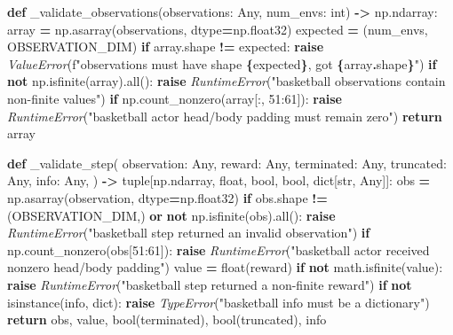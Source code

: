 \documentclass[
  american,
  11pt,
  letterpaper,
]{article}
\newenvironment{Shaded}{\begin{snugshade}}{\end{snugshade}}
\newcommand{\BuiltInTok}[1]{#1}
\newcommand{\ControlFlowTok}[1]{\textcolor[rgb]{0.13,0.29,0.53}{\textbf{#1}}}
\newcommand{\DecValTok}[1]{\textcolor[rgb]{0.00,0.00,0.81}{#1}}
\newcommand{\KeywordTok}[1]{\textcolor[rgb]{0.13,0.29,0.53}{\textbf{#1}}}
\newcommand{\NormalTok}[1]{#1}
\newcommand{\OperatorTok}[1]{\textcolor[rgb]{0.81,0.36,0.00}{\textbf{#1}}}
\newcommand{\PreprocessorTok}[1]{\textcolor[rgb]{0.56,0.35,0.01}{\textit{#1}}}
\newcommand{\SpecialCharTok}[1]{\textcolor[rgb]{0.81,0.36,0.00}{\textbf{#1}}}
\newcommand{\SpecialStringTok}[1]{\textcolor[rgb]{0.31,0.60,0.02}{#1}}
\newcommand{\StringTok}[1]{\textcolor[rgb]{0.31,0.60,0.02}{#1}}
\renewenvironment{Shaded}{\par\smallskip}{\par\smallskip}
\begin{document}
\begin{Shaded}
\begin{Highlighting}[]
\KeywordTok{def}\NormalTok{ \_validate\_observations(observations: Any, num\_envs: }\BuiltInTok{int}\NormalTok{) }\OperatorTok{{-}\textgreater{}}\NormalTok{ np.ndarray:}
\NormalTok{    array }\OperatorTok{=}\NormalTok{ np.asarray(observations, dtype}\OperatorTok{=}\NormalTok{np.float32)}
\NormalTok{    expected }\OperatorTok{=}\NormalTok{ (num\_envs, OBSERVATION\_DIM)}
    \ControlFlowTok{if}\NormalTok{ array.shape }\OperatorTok{!=}\NormalTok{ expected:}
        \ControlFlowTok{raise} \PreprocessorTok{ValueError}\NormalTok{(}\SpecialStringTok{f"observations must have shape }\SpecialCharTok{\{}\NormalTok{expected}\SpecialCharTok{\}}\SpecialStringTok{, got }\SpecialCharTok{\{}\NormalTok{array}\SpecialCharTok{.}\NormalTok{shape}\SpecialCharTok{\}}\SpecialStringTok{"}\NormalTok{)}
    \ControlFlowTok{if} \KeywordTok{not}\NormalTok{ np.isfinite(array).}\BuiltInTok{all}\NormalTok{():}
        \ControlFlowTok{raise} \PreprocessorTok{RuntimeError}\NormalTok{(}\StringTok{"basketball observations contain non{-}finite values"}\NormalTok{)}
    \ControlFlowTok{if}\NormalTok{ np.count\_nonzero(array[:, }\DecValTok{51}\NormalTok{:}\DecValTok{61}\NormalTok{]):}
        \ControlFlowTok{raise} \PreprocessorTok{RuntimeError}\NormalTok{(}\StringTok{"basketball actor head/body padding must remain zero"}\NormalTok{)}
    \ControlFlowTok{return}\NormalTok{ array}


\KeywordTok{def}\NormalTok{ \_validate\_step(}
\NormalTok{    observation: Any,}
\NormalTok{    reward: Any,}
\NormalTok{    terminated: Any,}
\NormalTok{    truncated: Any,}
\NormalTok{    info: Any,}
\NormalTok{) }\OperatorTok{{-}\textgreater{}} \BuiltInTok{tuple}\NormalTok{[np.ndarray, }\BuiltInTok{float}\NormalTok{, }\BuiltInTok{bool}\NormalTok{, }\BuiltInTok{bool}\NormalTok{, }\BuiltInTok{dict}\NormalTok{[}\BuiltInTok{str}\NormalTok{, Any]]:}
\NormalTok{    obs }\OperatorTok{=}\NormalTok{ np.asarray(observation, dtype}\OperatorTok{=}\NormalTok{np.float32)}
    \ControlFlowTok{if}\NormalTok{ obs.shape }\OperatorTok{!=}\NormalTok{ (OBSERVATION\_DIM,) }\KeywordTok{or} \KeywordTok{not}\NormalTok{ np.isfinite(obs).}\BuiltInTok{all}\NormalTok{():}
        \ControlFlowTok{raise} \PreprocessorTok{RuntimeError}\NormalTok{(}\StringTok{"basketball step returned an invalid observation"}\NormalTok{)}
    \ControlFlowTok{if}\NormalTok{ np.count\_nonzero(obs[}\DecValTok{51}\NormalTok{:}\DecValTok{61}\NormalTok{]):}
        \ControlFlowTok{raise} \PreprocessorTok{RuntimeError}\NormalTok{(}\StringTok{"basketball actor received nonzero head/body padding"}\NormalTok{)}
\NormalTok{    value }\OperatorTok{=} \BuiltInTok{float}\NormalTok{(reward)}
    \ControlFlowTok{if} \KeywordTok{not}\NormalTok{ math.isfinite(value):}
        \ControlFlowTok{raise} \PreprocessorTok{RuntimeError}\NormalTok{(}\StringTok{"basketball step returned a non{-}finite reward"}\NormalTok{)}
    \ControlFlowTok{if} \KeywordTok{not} \BuiltInTok{isinstance}\NormalTok{(info, }\BuiltInTok{dict}\NormalTok{):}
        \ControlFlowTok{raise} \PreprocessorTok{TypeError}\NormalTok{(}\StringTok{"basketball info must be a dictionary"}\NormalTok{)}
    \ControlFlowTok{return}\NormalTok{ obs, value, }\BuiltInTok{bool}\NormalTok{(terminated), }\BuiltInTok{bool}\NormalTok{(truncated), info}



\end{Highlighting}
\end{Shaded}
\end{document}
